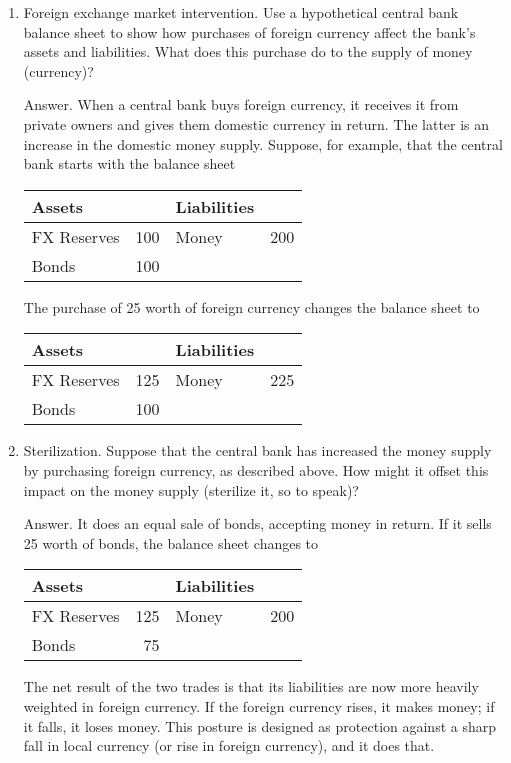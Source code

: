 \setlength{\leftmargini}{.5\oldleftmargini}
\begin{enumerate}
\item Foreign exchange market intervention.
Use a hypothetical central bank balance sheet to show how
purchases of foreign currency affect the bank's assets and liabilities. What does this purchase do to the supply of money (currency)?

Answer.  When a central bank buys foreign currency,
it receives it from private owners and gives them
    domestic currency in return.
    The latter is an increase in the domestic money supply.
    Suppose, for example, that the central bank
    starts with the balance sheet
\begin{center}
\begin{tabular}{lr|lr}
               Assets  &     &     Liabilities                     \\
               \hline
               FX Reserves &  100 &     Money  &  200   \\
               Bonds   & 100 & \\
\end{tabular}
\end{center}
%
The purchase of 25 worth of foreign currency
changes the balance sheet to
%
\begin{center}
\begin{tabular}{lr|lr}
               Assets  &     &     Liabilities                     \\
               \hline
               FX Reserves &  125 &     Money  &  225   \\
               Bonds   & 100 & \\
\end{tabular}
\end{center}
%

\item Sterilization.  Suppose that the central bank has increased the money supply by purchasing foreign currency, as described above.
    How might it offset this impact on the money supply (sterilize it, so to speak)?

Answer.  It does an equal sale of bonds, accepting money in return.
If it sells 25 worth of bonds, the balance sheet changes to
\begin{center}
\begin{tabular}{lr|lr}
               Assets  &     &     Liabilities                     \\
               \hline
               FX Reserves &  125 &     Money  &  200   \\
               Bonds   & 75 & \\
\end{tabular}
\end{center}
%
The net result of the two trades is that its liabilities are now more heavily weighted in foreign currency.
If the foreign currency rises, it makes money; if it falls, it loses money.
This posture is designed as protection against a sharp fall in local currency (or rise in foreign currency), and it does that.


\end{enumerate}
